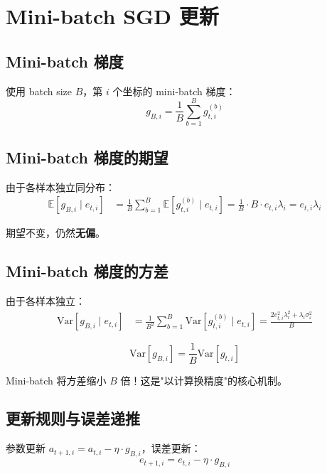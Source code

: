 \documentclass[12pt, a4paper]{ctexart}
\begin{document}
\section{Mini-batch SGD 更新}

\subsection{Mini-batch 梯度}

使用 batch size $B$，第 $i$ 个坐标的 mini-batch 梯度：
\begin{equation}
    g_{B,i} = \frac{1}{B}\sum_{b=1}^{B} g_{t,i}^{(b)}
\end{equation}

\subsection{Mini-batch 梯度的期望}

由于各样本独立同分布：
\begin{align}
    \mathbb{E}[g_{B,i} \mid e_{t,i}] &= \frac{1}{B}\sum_{b=1}^{B} \mathbb{E}[g_{t,i}^{(b)} \mid e_{t,i}] = \frac{1}{B} \cdot B \cdot e_{t,i} \lambda_i = e_{t,i} \lambda_i
\end{align}

期望不变，仍然\textbf{无偏}。

\subsection{Mini-batch 梯度的方差}

由于各样本独立：
\begin{align}
    \text{Var}[g_{B,i} \mid e_{t,i}] &= \frac{1}{B^2} \sum_{b=1}^{B} \text{Var}[g_{t,i}^{(b)} \mid e_{t,i}] = \frac{2 e_{t,i}^2 \lambda_i^2 + \lambda_i \sigma_\varepsilon^2}{B}
\end{align}

\begin{equation}
    \boxed{\text{Var}[g_{B,i}] = \frac{1}{B} \text{Var}[g_{t,i}]}
\end{equation}

Mini-batch 将方差缩小 $B$ 倍！这是"以计算换精度"的核心机制。

\subsection{更新规则与误差递推}

参数更新 $a_{t+1,i} = a_{t,i} - \eta \cdot g_{B,i}$，误差更新：
\begin{equation}
    e_{t+1,i} = e_{t,i} - \eta \cdot g_{B,i}
\end{equation}
\end{document}
